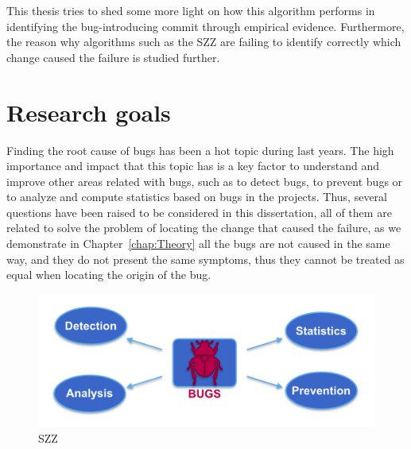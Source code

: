 \documentclass[a4paper, 12pt]{book}
\begin{document}
This thesis tries to shed some more light on how this algorithm performs in identifying the bug-introducing commit through empirical evidence. Furthermore, the reason why algorithms such as the SZZ are failing to identify correctly which change caused the failure is studied further.



\section{Research goals}
\label{subsec:goal}
Finding the root cause of bugs has been a hot topic during last years. The high importance and impact that this topic has is a key factor to understand and improve other areas related with bugs, such as to detect bugs, to prevent bugs or to analyze and compute statistics based on bugs in the projects. Thus, several questions have been raised to be considered in this dissertation, all of them are related to solve the problem of locating the change that caused the failure, as we demonstrate in Chapter~\ref{chap:Theory} all the bugs are not caused in the same way, and they do not present the same symptoms, thus they cannot be treated as equal when locating the origin of the bug.

\begin{figure}[ht]
\centering
\includegraphics[width=\columnwidth]{img/SZZimportant.png}
\caption{SZZ}
\label{fig:SZZ}       %
\end{figure}
\end{document}

